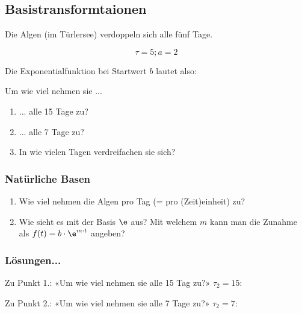 \subsection{Basistransformtaionen}
Die Algen (im Türlersee) verdoppeln sich alle fünf Tage.

$$\tau = 5; a= 2$$

Die Exponentialfunktion bei Startwert $b$ lautet also:



Um wie viel nehmen sie ...

\begin{enumerate}
\item ... alle 15 Tage zu?
\item ... alle 7 Tage zu?
\item In wie vielen Tagen verdreifachen sie sich?
\end{enumerate}
\subsubsection{Natürliche Basen}

\begin{enumerate}[resume]
\item Wie viel nehmen die Algen pro Tag (= pro (Zeit)einheit) zu?
\item {}Wie sieht es mit der Basis $\e$ aus? Mit welchem $m$ kann man die
  Zunahme als $f(t) = b \cdot{} \e^{m\cdot{}t}$ angeben?
\end{enumerate}
\newpage


\subsubsection*{Lösungen...}

Zu Punkt 1.: «Um wie viel nehmen sie alle 15 Tag zu?» $\tau_2=15$:


Zu Punkt 2.: «Um wie viel nehmen sie alle 7 Tage zu?» $\tau_2=7$:


